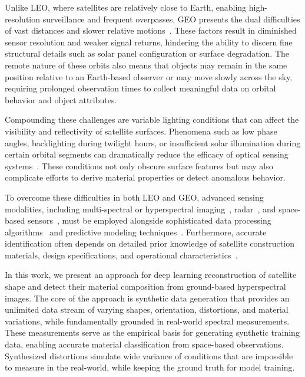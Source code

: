 \documentclass[12pt]{elsarticle}
\begin{document}
Unlike LEO, where satellites are relatively close to Earth, enabling high-resolution surveillance and frequent overpasses, GEO  presents the dual difficulties of vast distances and slower relative motions~\cite{sukhov2015some}. These factors result in diminished sensor resolution and weaker signal returns, hindering the ability to discern fine structural details such as solar panel configuration or surface degradation. The remote nature of these orbits also means that objects may remain in the same position relative to an Earth-based observer or may move slowly across the sky, requiring prolonged observation times to collect meaningful data on orbital behavior and object attributes.

Compounding these challenges are variable lighting conditions that can affect the visibility and reflectivity of satellite surfaces. Phenomena such as low phase angles, backlighting during twilight hours, or insufficient solar illumination during certain orbital segments can dramatically reduce the efficacy of optical sensing systems~\cite{campbell2024stingray}. These conditions not only obscure surface features but may also complicate efforts to derive material properties or detect anomalous behavior.

To overcome these difficulties in both LEO and GEO, advanced sensing modalities, including multi-spectral or hyperspectral imaging~\cite{zhao2016multicolor, vasile2024space}, radar~\cite{guarnieri2015advanced, benson2021radar}, and space-based sensors~\cite{scott2016combined}, must be employed alongside sophisticated data processing algorithms~\cite{scorsoglio2024orbit} and predictive modeling techniques~\cite{lee2025application}. Furthermore, accurate identification often depends on detailed prior knowledge of satellite construction materials, design specifications, and operational characteristics~\cite{richmond2017satellite, krag2024innovative}. 

In this work, we present an approach for deep learning reconstruction of satellite shape and detect their 
material composition from ground-based hyperspectral images. The core of the approach is synthetic data 
generation that provides an unlimited data stream of varying shapes, orientation, distortions, and material 
variations, while fundamentally grounded in real-world spectral measurements. These measurements 
serve as the empirical basis for generating synthetic training data, enabling accurate material classification 
from space-based observations. Synthesized distortions simulate wide variance of conditions that are 
impossible to measure in the real-world, while keeping the ground truth for model training.
\end{document}
